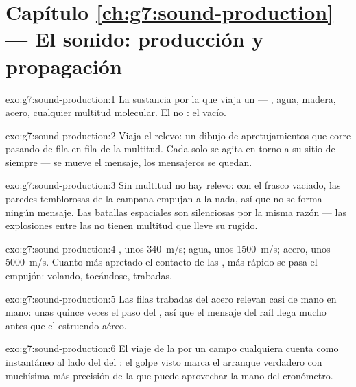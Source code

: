 \section*{Capítulo \ref{ch:g7:sound-production} --- El sonido: producción y propagación}

\begin{solution}{exo:g7:sound-production:1}
La sustancia por la que viaja un  --- , agua,
madera, acero, cualquier multitud molecular. El no : el vacío.
\end{solution}

\begin{solution}{exo:g7:sound-production:2}
Viaja el relevo: un dibujo de apretujamientos que corre pasando de
fila en fila de la multitud. Cada  solo se agita en torno a
su sitio de siempre --- se mueve el mensaje, los mensajeros se quedan.
\end{solution}

\begin{solution}{exo:g7:sound-production:3}
Sin multitud no hay relevo: con el frasco vaciado, las paredes
temblorosas de la campana empujan a la nada, así que no se forma
ningún mensaje. Las batallas espaciales son silenciosas por la misma
razón --- las explosiones entre las  no tienen multitud que
lleve su rugido.
\end{solution}

\begin{solution}{exo:g7:sound-production:4}
, unos \qty{340}{m/s}; agua, unos \qty{1500}{m/s}; acero, unos
\qty{5000}{m/s}. Cuanto más apretado el contacto de las
, más rápido se pasa el empujón: volando, tocándose,
trabadas.
\end{solution}

\begin{solution}{exo:g7:sound-production:5}
Las filas trabadas del acero relevan casi de mano en mano: unas quince
veces el paso del , así que el mensaje del raíl llega mucho antes
que el estruendo aéreo.
\end{solution}

\begin{solution}{exo:g7:sound-production:6}
El viaje de la  por un campo cualquiera cuenta como instantáneo al
lado del del : el golpe visto marca el arranque verdadero con
muchísima más precisión de la que puede aprovechar la mano del
cronómetro.
\end{solution}

